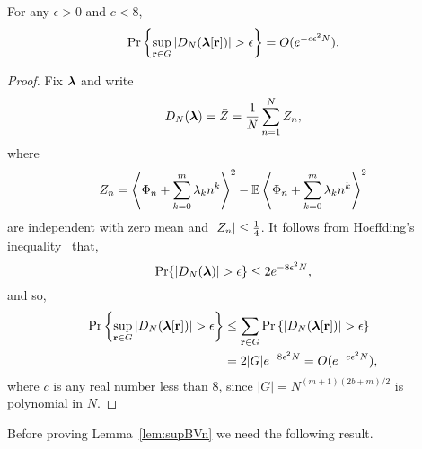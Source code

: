 \documentclass[journal]{IEEEtran}
\begin{document}


\begin{lemma}\label{lem:supVjk}
For any $\epsilon > 0$ and $c < 8$,
\[
\operatorname{Pr}{\left\{    \sup_{\mathbf{r} \in G}\left\vert  D_N(\boldsymbol{\lambda}[\mathbf{r}])   \right\vert > \epsilon  \right\}} = O(e^{-c \epsilon^2 N}).
\]
\end{lemma}
 \begin{proof}
Fix $\boldsymbol{\lambda}$ and write 
\[
D_N(\boldsymbol{\lambda}) = \bar{Z} = \frac{1}{N}  \sum_{n=1}^{N}Z_{n},
\] 
where
 \[
 Z_{n}=\left\langle   \Phi_n+\sum_{k = 0}^{m}{\lambda_k n^k}  \right\rangle^{2} - {\mathbb E} \left\langle   \Phi_n + \sum_{k = 0}^{m}{\lambda_k n^k}  \right\rangle^{2}
 \]
 are independent with zero mean and $\left\vert Z_n \right\vert \leq \tfrac{1}{4}$. It follows from Hoeffding's inequality~\cite{Hoeffding_inequality_1963} that,  
\[
\operatorname{Pr}\{ \left\vert D_N(\boldsymbol{\lambda}) \right\vert > \epsilon \} \leq 2e^{ - 8 \epsilon^2 N},
\] 
and so,
 \begin{align*}
 \prob\cubr{  \sup_{\rbf\in G}\left\vert D_N(\lambdabf[\rbf]) \right\vert >\epsilon }  &\leq \sum_{\rbf \in G} \prob\scubr{  \left\vert D_N(\lambdabf[\rbf])  \right\vert >\epsilon } \nonumber \\
&= 2 |G| e^{ - 8 \epsilon^2 N} = O(e^{-c \epsilon^2 N}), \label{eq:betaprobconv}
\end{align*}
where $c$ is any real number less than $8$, since $|G| = N^{(m+1)(2b + m)/2}$ is polynomial in $N$.
\end{proof}

Before proving Lemma~\ref{lem:supBVn} we need the following result.
\end{document}
